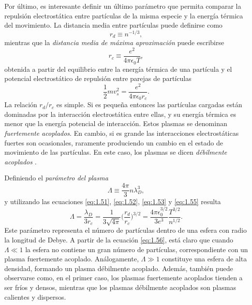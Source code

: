 Por último, es interesante definir un último parámetro que permita comparar la repulsión electrostática entre partículas de la misma especie y la energía térmica del movimiento. La distancia media entre partículas puede definirse como 
\begin{equation}\label{eq:1.52}
  r_{d} \equiv n^{-1/3},
\end{equation}
mientras que la \emph{distancia media de máxima aproximación} puede escribirse
\begin{equation}\label{eq:1.53}
  r_{c} \equiv \frac{e^{2}}{4 \pi \epsilon_{0}T},
\end{equation}
obtenida a partir del equilibrio entre la energía térmica de una partícula y el potencial electrostático de repulsión entre parejas de partículas
\begin{equation}\label{eq:1.54}
  \frac{1}{2}mv^{2}_{s} = \frac{e^{2}}{4 \pi \epsilon_{0}r_{c}}.
\end{equation}
La relación $r_{d}/r_{c}$ es simple. Si es pequeña entonces las partículas cargadas están dominadas por la interacción electrostática entre ellas, y su energía térmica es menor que la energía potencial de interacción. Estos plasmas se denominan \emph{fuertemente acoplados}. En cambio, si es grande las interacciones electrostáticas fuertes son ocasionales, raramente produciendo un cambio en el estado de movimiento de las partículas. En este caso, los plasmas se dicen \emph{débilmente acoplados} \autocite{Fitzpatrick2022}.

Definiendo el \emph{parámetro del plasma} 
\begin{equation}\label{eq:1.55}
  \Lambda \equiv \frac{4 \pi}{3}n \lambda^{3}_{D},
\end{equation}
y utilizando las ecuaciones \eqref{eq:1.51}, \eqref{eq:1.52}, \eqref{eq:1.53} y \eqref{eq:1.55} resulta
\begin{equation}\label{eq:1.56}
  \Lambda = \frac{\lambda_{D}}{3r_{c}} = \frac{1}{3\sqrt{4 \pi}}\bigg(\frac{r_{d}}{r_{c}}\bigg)^{3/2} = \frac{4 \pi \epsilon^{3/2}_{0}}{3e^{3}}\frac{T^{3/2}}{n^{1/2}}.
\end{equation}
Este parámetro representa el número de partículas dentro de una esfera con radio la longitud de Debye. A partir de la ecuación \eqref{eq:1.56}, está claro que cuando $\Lambda \ll 1$ la esfera no contiene un gran número de partículas, correspondiente con un plasma fuertemente acoplado. Análogamente, $\Lambda \gg 1$ constituye una esfera de alta densidad, formando un plasma débilmente acoplado. Además, también puede observarse como, en el primer caso, los plasmas fuertemente acoplados tienden a ser fríos y densos, mientras que los plasmas débilmente acoplados son plasmas calientes y dispersos.

